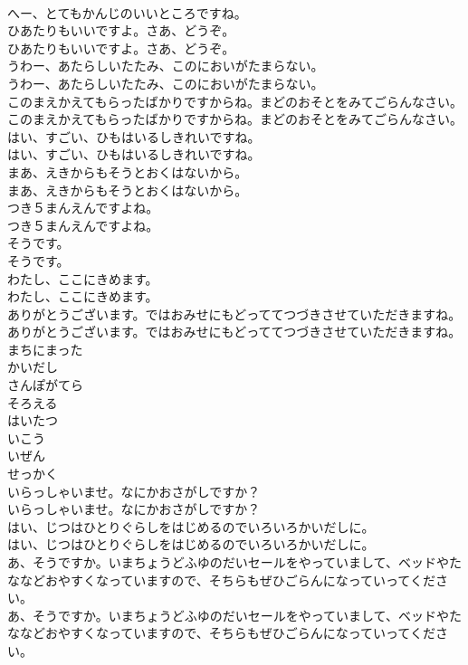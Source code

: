 \documentclass[8pt]{extreport}
\begin{document}
\begin{CJK}{UTF8}{min}
\\	へー、とてもかんじのいいところですね。
\\	ひあたりもいいですよ。さあ、どうぞ。
\\	ひあたりもいいですよ。さあ、どうぞ。
\\	うわー、あたらしいたたみ、このにおいがたまらない。
\\	うわー、あたらしいたたみ、このにおいがたまらない。
\\	このまえかえてもらったばかりですからね。まどのおそとをみてごらんなさい。
\\	このまえかえてもらったばかりですからね。まどのおそとをみてごらんなさい。
\\	はい、すごい、ひもはいるしきれいですね。
\\	はい、すごい、ひもはいるしきれいですね。
\\	まあ、えきからもそうとおくはないから。
\\	まあ、えきからもそうとおくはないから。
\\	つき５まんえんですよね。
\\	つき５まんえんですよね。
\\	そうです。
\\	そうです。
\\	わたし、ここにきめます。
\\	わたし、ここにきめます。
\\	ありがとうございます。ではおみせにもどっててつづきさせていただきますね。
\\	ありがとうございます。ではおみせにもどっててつづきさせていただきますね。
\\	まちにまった
\\	かいだし
\\	さんぽがてら
\\	そろえる
\\	はいたつ
\\	いこう
\\	いぜん
\\	せっかく
\\	いらっしゃいませ。なにかおさがしですか？
\\	いらっしゃいませ。なにかおさがしですか？
\\	はい、じつはひとりぐらしをはじめるのでいろいろかいだしに。
\\	はい、じつはひとりぐらしをはじめるのでいろいろかいだしに。
\\	あ、そうですか。いまちょうどふゆのだいセールをやっていまして、ベッドやたななどおやすくなっていますので、そちらもぜひごらんになっていってください。
\\	あ、そうですか。いまちょうどふゆのだいセールをやっていまして、ベッドやたななどおやすくなっていますので、そちらもぜひごらんになっていってください。

\end{CJK}
\end{document}
